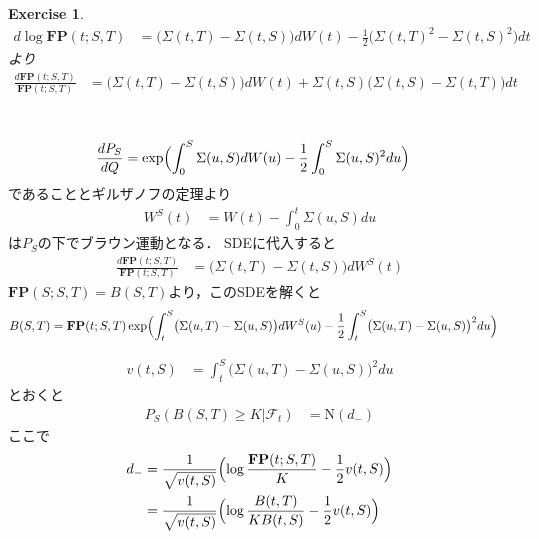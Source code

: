 \documentclass[11pt, a4paper]{jsarticle}
\newcommand{\FP}{\textbf{FP}}
\newtheorem{exercise}{Exercise}[section]
\begin{document}
\hrulefill
\begin{exercise}
\begin{align}
d \log \FP(t; S, T)
& =
\bigl( \Sigma(t, T) - \Sigma(t, S) \bigr) dW(t) - \frac{1}{2} \bigl( \Sigma(t, T)^2 - \Sigma(t, S)^2 \bigr) dt \nonumber
\end{align}
より
\begin{align}
\frac{d\FP(t; S, T)}{\FP(t; S, T)}
& =
\bigl( \Sigma(t, T) - \Sigma(t, S) \bigr) dW(t) + \Sigma(t, S) \bigl( \Sigma(t, S) - \Sigma(t, T) \bigr) dt \nonumber
\end{align}
\end{exercise}
\hrulefill \\

\begin{align}
\frac{dP_S}{dQ}
& =
\exp \Bigl( \int_0^S \Sigma(u, S) dW(u) - \frac{1}{2} \int_0^S \Sigma(u, S)^2 du \Bigr) \nonumber
\end{align}
であることとギルザノフの定理より
\begin{align}
W^S(t)
& =
W(t) - \int_0^t \Sigma(u, S) du \nonumber
\end{align}
は$P_S$の下でブラウン運動となる．
SDEに代入すると
\begin{align}
\frac{d\FP(t; S, T)}{\FP(t; S, T)}
& =
\bigl( \Sigma(t, T) - \Sigma(t, S) \bigr) dW^S(t) \nonumber
\end{align}
$\FP(S; S, T) = B(S, T)$より，このSDEを解くと
\begin{align}
B(S, T)
& =
\FP(t; S, T)
\exp \Bigl( \int_t^S \bigl( \Sigma(u, T) - \Sigma(u, S) \bigr) dW^S(u) - \frac{1}{2} \int_t^S \bigl( \Sigma(u, T) - \Sigma(u, S) \bigr)^2 du \Bigr) \nonumber
\end{align}

\begin{align}
v(t, S)
& =
\int_t^S \bigl( \Sigma(u, T) - \Sigma(u, S) \bigr)^2 du \nonumber
\end{align}
とおくと
\begin{align}
P_S (B(S, T) \geq K | \mathcal{F}_t)
& =
\mathrm{N} (d_-) \nonumber
\end{align}
ここで
\begin{align}
d_-
& =
\frac{1}{\sqrt{v(t, S)}} \Bigl( \log \frac{\FP(t; S, T)}{K} - \frac{1}{2} v(t, S) \Bigr) \nonumber \\
& =
\frac{1}{\sqrt{v(t, S)}} \Bigl( \log \frac{B(t, T)}{K B(t, S)} - \frac{1}{2} v(t, S) \Bigr) \nonumber
\end{align}
\end{document}

